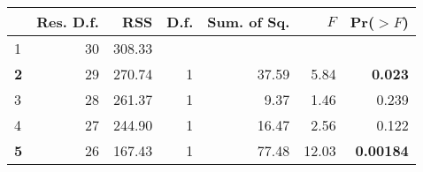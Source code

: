 \begin{tabular}{lrrrrrr}
  \hline
 & Res. D.f. & RSS & D.f. & Sum. of Sq. & $F$ & Pr($>F$) \\ 
  \hline
1 & 30 & 308.33 &  &  &  &  \\ 
  \textbf{2} & 29 & 270.74 & 1 & 37.59 & 5.84 & \textbf{0.023} \\ 
  3 & 28 & 261.37 & 1 & 9.37 & 1.46 & 0.239 \\ 
  4 & 27 & 244.90 & 1 & 16.47 & 2.56 & 0.122 \\ 
  \textbf{5} & 26 & 167.43 & 1 & 77.48 & 12.03 & \textbf{0.00184} \\ 
   \hline
\end{tabular}
